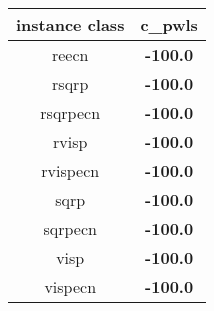 \begin{tabular}{c|c}
instance class & c\_pwls \\ 
\hline
reecn        & {\bf -100.0} \\ 
rsqrp        & {\bf -100.0} \\ 
rsqrpecn     & {\bf -100.0} \\ 
rvisp        & {\bf -100.0} \\ 
rvispecn     & {\bf -100.0} \\ 
sqrp         & {\bf -100.0} \\ 
sqrpecn      & {\bf -100.0} \\ 
visp         & {\bf -100.0} \\ 
vispecn      & {\bf -100.0} \\ 
\end{tabular}